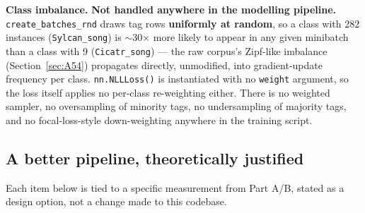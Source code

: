 \documentclass[11pt]{article}
\begin{document}
\textbf{Class imbalance.} \textbf{Not handled anywhere in the modelling
pipeline.} \texttt{create\_batches\_rnd} draws tag rows \textbf{uniformly at
random}, so a class with 282 instances (\texttt{Sylcan\_song}) is
$\sim$30$\times$ more likely to appear in any given minibatch than a class
with 9 (\texttt{Cicatr\_song}) --- the raw corpus's Zipf-like imbalance
(Section~\ref{sec:A54}) propagates directly, unmodified, into
gradient-update frequency per class. \texttt{nn.NLLLoss()} is instantiated
with no \texttt{weight} argument, so the loss itself applies no per-class
re-weighting either. There is no weighted sampler, no oversampling of
minority tags, no undersampling of majority tags, and no focal-loss-style
down-weighting anywhere in the training script.

\subsection{A better pipeline, theoretically justified}
\label{sec:C4}

Each item below is tied to a specific measurement from Part A/B, stated as a
design option, not a change made to this codebase.
\end{document}
